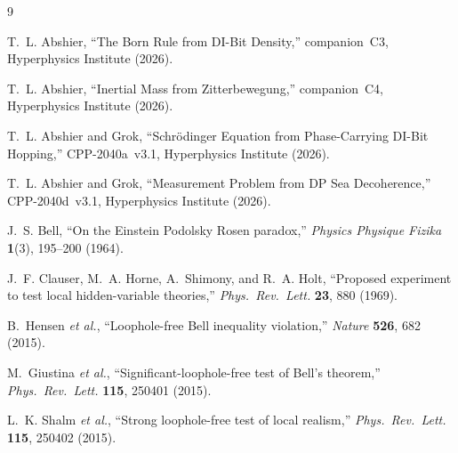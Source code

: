 \documentclass[11pt,a4paper]{article}
\begin{document}

\begin{thebibliography}{9}

T.~L. Abshier, ``The Born Rule from DI-Bit Density,''
companion~C3, Hyperphysics Institute (2026).

T.~L. Abshier, ``Inertial Mass from Zitterbewegung,''
companion~C4, Hyperphysics Institute (2026).

T.~L. Abshier and Grok,
``Schr\"{o}dinger Equation from Phase-Carrying DI-Bit Hopping,''
CPP-2040a~v3.1, Hyperphysics Institute (2026).

T.~L. Abshier and Grok,
``Measurement Problem from DP Sea Decoherence,''
CPP-2040d~v3.1, Hyperphysics Institute (2026).

J.~S. Bell, ``On the Einstein Podolsky Rosen paradox,''
\textit{Physics Physique Fizika} \textbf{1}(3), 195--200 (1964).

J.~F. Clauser, M.~A. Horne, A.~Shimony, and R.~A. Holt,
``Proposed experiment to test local hidden-variable theories,''
\textit{Phys.\ Rev.\ Lett.} \textbf{23}, 880 (1969).

B.~Hensen \textit{et al.}, ``Loophole-free Bell inequality violation,''
\textit{Nature} \textbf{526}, 682 (2015).

M.~Giustina \textit{et al.},
``Significant-loophole-free test of Bell's theorem,''
\textit{Phys.\ Rev.\ Lett.} \textbf{115}, 250401 (2015).

L.~K. Shalm \textit{et al.},
``Strong loophole-free test of local realism,''
\textit{Phys.\ Rev.\ Lett.} \textbf{115}, 250402 (2015).

\end{thebibliography}
\end{document}
